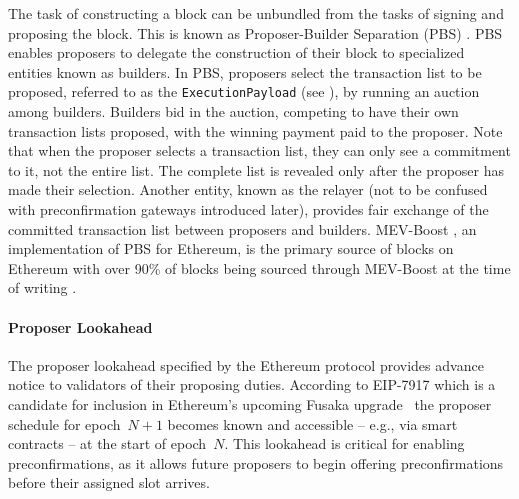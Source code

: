 \documentclass[a4paper]{article}
\theoremstyle{boldstyle}
\begin{document}
The task of constructing a block can be unbundled from the tasks of signing and proposing the block. This is known as Proposer-Builder Separation (PBS) \cite{W:Proposer-builderseparation}. PBS enables proposers to delegate the construction of their block to specialized entities known as builders.  
In PBS, proposers select the transaction list to be proposed, referred to as the \texttt{ExecutionPayload} (see \cite{W:TheMerge--TheBeaconChain}), by running an auction among builders. Builders bid in the auction, competing to have their own transaction lists proposed, with the winning payment paid to the proposer. Note that when the proposer selects a transaction list, they can only see a commitment to it, not the entire list. The complete list is revealed only after the proposer has made their selection. Another entity, known as the relayer (not to be confused with preconfirmation gateways introduced later), provides fair exchange \cite{P:Fairexchangewithasemi-trustedthirdparty} of the committed transaction list between proposers and builders. MEV-Boost \cite{MEV-Boost}, an implementation of PBS for Ethereum, is the primary source of blocks on Ethereum with over 90\% of blocks being sourced through MEV-Boost at the time of writing \cite{MEV.pics}. 

    \paragraph{Proposer Lookahead} \label{proposerLookahead}
        The proposer lookahead specified by the Ethereum protocol provides advance notice to validators of their proposing duties.
        According to EIP-7917 \cite{EIP7917} which is a candidate for inclusion in Ethereum’s upcoming Fusaka upgrade~\cite{W:EIP-7607:HardforkMeta-Fusaka} the proposer schedule for epoch~$N+1$ becomes known and accessible -- e.g., via smart contracts -- at the start of epoch~$N$. %
        This lookahead is critical for enabling preconfirmations, as it allows future proposers to begin offering preconfirmations before their assigned slot arrives. \\
\end{document}
